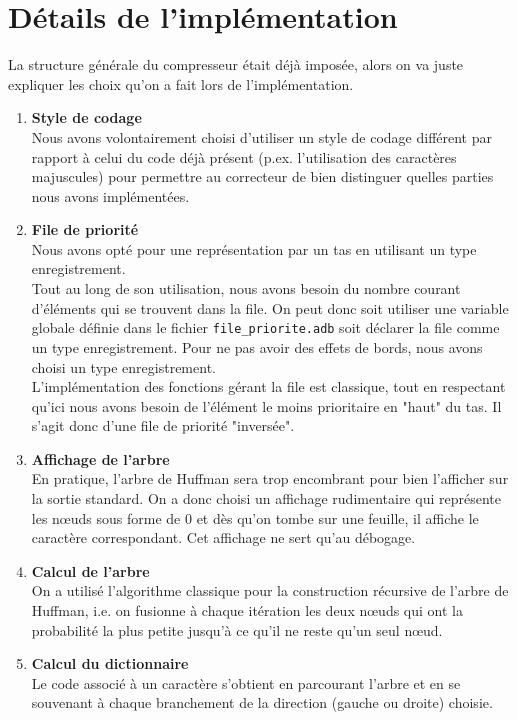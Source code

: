 \documentclass[a4paper,11pt]{article}
\begin{document}
\section{Détails de l'implémentation}
	La structure générale du compresseur était déjà imposée, alors on va juste expliquer les choix qu'on a fait lors de l'implémentation.
	\begin{enumerate}
		\item{\textbf{Style de codage}}\\
			Nous avons volontairement choisi d'utiliser un style de codage différent par rapport à celui du code déjà présent (p.ex. l'utilisation des caractères majuscules) pour permettre au correcteur de bien distinguer quelles parties nous avons implémentées.
		\item{\textbf{File de priorité}}\\
			Nous avons opté pour une représentation par un tas en utilisant un type enregistrement. \\
			Tout au long de son utilisation, nous avons besoin du nombre courant d'éléments qui se trouvent dans la file. On peut donc soit utiliser une variable globale définie dans le fichier \verb+file_priorite.adb+ soit déclarer la file comme un type enregistrement. Pour ne pas avoir des effets de bords, nous avons choisi un type enregistrement.\\
			L'implémentation des fonctions gérant la file est classique, tout en respectant qu'ici nous avons besoin de l'élément le moins prioritaire en "haut" du tas. Il s'agit donc d'une file de priorité "inversée".
		\item{\textbf{Affichage de l'arbre}}\\
			En pratique, l'arbre de Huffman sera trop encombrant pour bien l'afficher sur la sortie standard. On a donc choisi un affichage rudimentaire qui représente les n\oe{}uds sous forme de $0$ et dès qu'on tombe sur une feuille, il affiche le caractère correspondant. Cet affichage ne sert qu'au débogage.
		\item{\textbf{Calcul de l'arbre}}\\
			On a utilisé l'algorithme classique pour la construction récursive de l'arbre de Huffman, i.e. on fusionne à chaque itération les deux n\oe{}uds qui ont la probabilité la plus petite jusqu'à ce qu'il ne reste qu'un seul n\oe{}ud.
		\item{\textbf{Calcul du dictionnaire}}\\
			Le code associé à un caractère s'obtient en parcourant l'arbre et en se souvenant à chaque branchement de la direction (gauche ou droite) choisie.\\

\end{enumerate}
\end{document}

